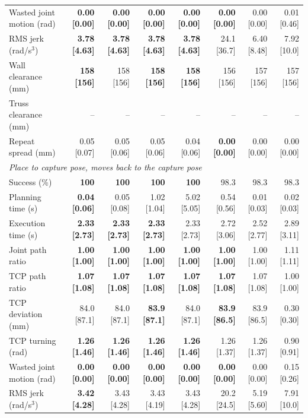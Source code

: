 \begin{table}[t]
\begin{tabular}{lrrrrrrr}
Wasted joint motion (rad) & \textbf{0.00 [0.00]} & \textbf{0.00 [0.00]} & \textbf{0.00 [0.00]} & \textbf{0.00 [0.00]} & \textbf{0.00 [0.00]} & 0.00 [0.00] & 0.01 [0.46] \\
RMS jerk (rad/s$^3$) & \textbf{3.78 [4.63]} & \textbf{3.78 [4.63]} & \textbf{3.78 [4.63]} & \textbf{3.78 [4.63]} & 24.1 [36.7] & 6.40 [8.48] & 7.92 [10.0] \\
Wall clearance (mm) & \textbf{158 [156]} & 158 [156] & \textbf{158 [156]} & \textbf{158 [156]} & 156 [156] & 157 [156] & 157 [156] \\
Truss clearance (mm) & -- & -- & -- & -- & -- & -- & -- \\
Repeat spread (mm) & 0.05 [0.07] & 0.05 [0.06] & 0.05 [0.06] & 0.04 [0.06] & \textbf{0.00 [0.00]} & 0.00 [0.00] & 0.00 [0.00] \\
\midrule
\multicolumn{8}{l}{\emph{Place to capture pose, moves back to the capture pose}} \\
Success (\%) & \textbf{100} & \textbf{100} & \textbf{100} & \textbf{100} & 98.3 & 98.3 & 98.3 \\
Planning time (s) & \textbf{0.04 [0.06]} & 0.05 [0.08] & 1.02 [1.04] & 5.02 [5.05] & 0.54 [0.56] & 0.01 [0.03] & 0.02 [0.03] \\
Execution time (s) & \textbf{2.33 [2.73]} & \textbf{2.33 [2.73]} & \textbf{2.33 [2.73]} & 2.33 [2.73] & 2.72 [3.06] & 2.52 [2.77] & 2.89 [3.11] \\
Joint path ratio & \textbf{1.00 [1.00]} & \textbf{1.00 [1.00]} & \textbf{1.00 [1.00]} & \textbf{1.00 [1.00]} & \textbf{1.00 [1.00]} & 1.00 [1.00] & 1.11 [1.11] \\
TCP path ratio & \textbf{1.07 [1.08]} & \textbf{1.07 [1.08]} & \textbf{1.07 [1.08]} & \textbf{1.07 [1.08]} & \textbf{1.07 [1.08]} & 1.07 [1.08] & 1.00 [1.00] \\
TCP deviation (mm) & 84.0 [87.1] & 84.0 [87.1] & \textbf{83.9 [87.1]} & 84.0 [87.1] & \textbf{83.9 [86.5]} & 83.9 [86.5] & 0.30 [0.30] \\
TCP turning (rad) & \textbf{1.26 [1.46]} & \textbf{1.26 [1.46]} & \textbf{1.26 [1.46]} & \textbf{1.26 [1.46]} & 1.26 [1.37] & 1.26 [1.37] & 0.90 [0.91] \\
Wasted joint motion (rad) & \textbf{0.00 [0.00]} & \textbf{0.00 [0.00]} & \textbf{0.00 [0.00]} & \textbf{0.00 [0.00]} & \textbf{0.00 [0.00]} & 0.00 [0.00] & 0.15 [0.26] \\
RMS jerk (rad/s$^3$) & \textbf{3.42 [4.28]} & 3.43 [4.28] & 3.43 [4.19] & 3.43 [4.28] & 20.2 [24.5] & 5.19 [5.60] & 7.91 [10.0] \\

\end{tabular}
\end{table}
